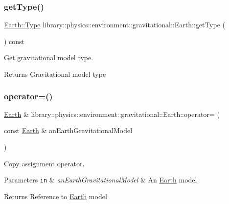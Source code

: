 \subsubsection{\texorpdfstring{get\+Type()}{getType()}}
{\footnotesize\ttfamily \hyperlink{classlibrary_1_1physics_1_1environment_1_1gravitational_1_1_earth_ab20a2b260831c66ac10f7b9a307d25ca}{Earth\+::\+Type} library\+::physics\+::environment\+::gravitational\+::\+Earth\+::get\+Type (\begin{DoxyParamCaption}{ }\end{DoxyParamCaption}) const}



Get gravitational model type. 

\begin{DoxyReturn}{Returns}
Gravitational model type 
\end{DoxyReturn}
\mbox{\label{classlibrary_1_1physics_1_1environment_1_1gravitational_1_1_earth_a2b58f2040af5b0e6180e1dbb8c9b9ee8}} 
\subsubsection{\texorpdfstring{operator=()}{operator=()}}
{\footnotesize\ttfamily \hyperlink{classlibrary_1_1physics_1_1environment_1_1gravitational_1_1_earth}{Earth} \& library\+::physics\+::environment\+::gravitational\+::\+Earth\+::operator= (\begin{DoxyParamCaption}\item[{const \hyperlink{classlibrary_1_1physics_1_1environment_1_1gravitational_1_1_earth}{Earth} \&}]{an\+Earth\+Gravitational\+Model }\end{DoxyParamCaption})}



Copy assignment operator. 


\begin{DoxyParams}[1]{Parameters}
\mbox{\tt in}  & {\em an\+Earth\+Gravitational\+Model} & An \hyperlink{classlibrary_1_1physics_1_1environment_1_1gravitational_1_1_earth}{Earth} model \\
\hline
\end{DoxyParams}
\begin{DoxyReturn}{Returns}
Reference to \hyperlink{classlibrary_1_1physics_1_1environment_1_1gravitational_1_1_earth}{Earth} model 
\end{DoxyReturn}


